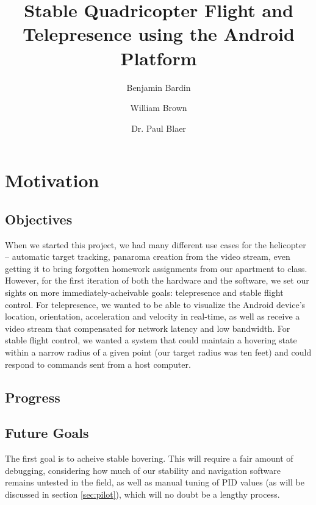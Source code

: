 

\author{Benjamin Bardin \and William Brown 
  \and Dr. Paul Blaer}
\title{Stable Quadricopter Flight and 
  Telepresence using the Android Platform}


\maketitle
\tableofcontents
\newpage

\todolist
\newpage

\section{Motivation}
\subsection{Objectives}
When we started this project, we had many different use cases for the
helicopter -- automatic target tracking, panaroma creation from the
video stream, even getting it to bring forgotten homework assignments
from our apartment to class. However, for the first iteration of both
the hardware and the software, we set our sights on more
immediately-acheivable goals: telepresence and stable flight
control. For telepresence, we wanted to be able to visualize the
Android device's location, orientation, acceleration and velocity in
real-time, as well as receive a video stream that compensated for
network latency and low bandwidth. For stable flight control, we
wanted a system that could maintain a hovering state within a narrow
radius of a given point (our target radius was ten feet) and could
respond to commands sent from a host computer.

\subsection{Progress}

\subsection{Future Goals}
The first goal is to acheive stable hovering. This will require a fair
amount of debugging, considering how much of our stability and
navigation software remains untested in the field, as well as manual
tuning of PID values (as will be discussed in section
\ref{sec:pilot}), which will no doubt be a lengthy process.

